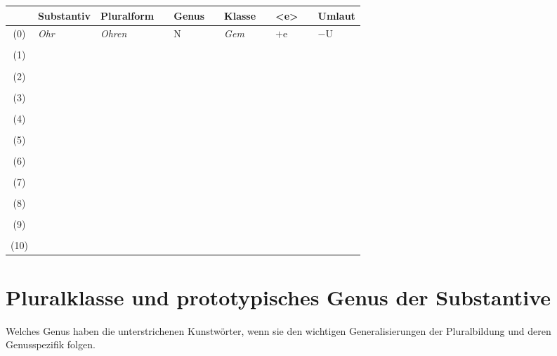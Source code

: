 \documentclass[12pt,a4paper,twoside]{article}
\newcommand{\gruen}[1]{\textcolor{gruen}{#1}}
\begin{document}
\begin{center}
  \begin{longtable}[h]{clp{}cp{}cp{}cp{}cp{}}
    \toprule
    & \textbf{Substantiv} & \textbf{Pluralform} && \textbf{Genus} && \textbf{Klasse} && \textbf{<e>} && \textbf{Umlaut} \\
    \midrule{}
    \endhead
    (0) & \textit{Ohr} & \gruen{\textit{Ohren}} && \gruen{N} && \gruen{\textit{Gem}} && \gruen{$+$e} && \gruen{$-$U} \\
    &&&&&&&& \\
    (1) & \textit{} &&&&&&&&& \\
    &&&&&&&& \\
    (2) & \textit{} &&&&&&&&& \\
    &&&&&&&& \\
    (3) & \textit{} &&&&&&&&& \\
    &&&&&&&& \\
    (4) & \textit{} &&&&&&&&& \\
    &&&&&&&& \\
    (5) & \textit{} &&&&&&&&& \\
    &&&&&&&& \\
    (6) & \textit{} &&&&&&&&& \\
    &&&&&&&& \\
    (7) & \textit{} &&&&&&&&& \\
    &&&&&&&& \\
    (8) & \textit{} &&&&&&&&& \\
    &&&&&&&& \\
    (9) & \textit{} &&&&&&&&& \\
    &&&&&&&& \\
    (10) & \textit{} &&&&&&&&& \\
  \end{longtable}
\end{center}


\section{Pluralklasse und prototypisches Genus der Substantive}

Welches Genus haben die unterstrichenen Kunstwörter, wenn sie den wichtigen Generalisierungen der Pluralbildung und deren Genusspezifik folgen.
\end{document}
